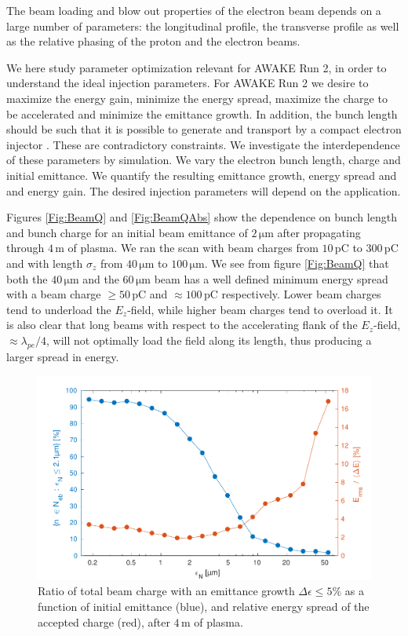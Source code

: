 \documentclass[aps,prstab,reprint,amsmath,amssymb,groupedaddress]{revtex4-1}
\newcommand{\unit}[1]{\,\mathrm{#1}}
\begin{document}
The beam loading and blow out properties of the electron beam depends on a large number of parameters: the longitudinal
profile, the transverse profile as well as the relative phasing of the proton and the electron beams.

We here study parameter optimization relevant for AWAKE Run 2, in order to understand the ideal injection parameters.
For AWAKE Run 2 we desire to maximize the energy gain, minimize the energy spread, maximize the charge to be accelerated
and minimize the emittance growth. In addition, the bunch length should be such that it is possible to generate and
transport by a compact electron injector \cite{adli:2016}. These are contradictory constraints. We investigate the
interdependence of these parameters by simulation. We vary the electron bunch length, charge and initial emittance. We
quantify the resulting emittance growth, energy spread and and energy gain. The desired injection parameters will depend
on the application.

Figures \ref{Fig:BeamQ} and \ref{Fig:BeamQAbs} show the dependence on bunch length and bunch charge for an initial beam
emittance of $2\unit{\mu m}$ after propagating through $4\unit{m}$ of plasma. We ran the scan with beam charges from
$10\unit{pC}$ to $300\unit{pC}$ and with length $\sigma_{z}$ from $40\unit{\mu m}$ to $100\unit{\mu m}$. We see from
figure \ref{Fig:BeamQ} that both the $40\unit{\mu m}$ and the $60\unit{\mu m}$ beam has a well defined minimum energy
spread with a beam charge $\geq 50\unit{pC}$ and $\approx 100\unit{pC}$ respectively. Lower beam charges tend to
underload the $E_{z}$-field, while higher beam charges tend to overload it. It is also clear that long beams with
respect to the accelerating flank of the $E_{z}$-field, $\approx\lambda_{pe}/4$, will not optimally load the field along
its length, thus producing a larger spread in energy.

\begin{figure}[hbt]
    \includegraphics[width=\linewidth,trim={2mm 0mm 2mm 0mm},clip]{figures/beamQualityEmittance}
    \caption{\label{Fig:BeamQEmit} Ratio of total beam charge with an emittance growth $\Delta\epsilon \leq 5\%$ as a
        function of initial emittance (blue), and relative energy spread of the accepted charge (red), after $4\unit{m}$
        of plasma.}
\end{figure}
\end{document}
